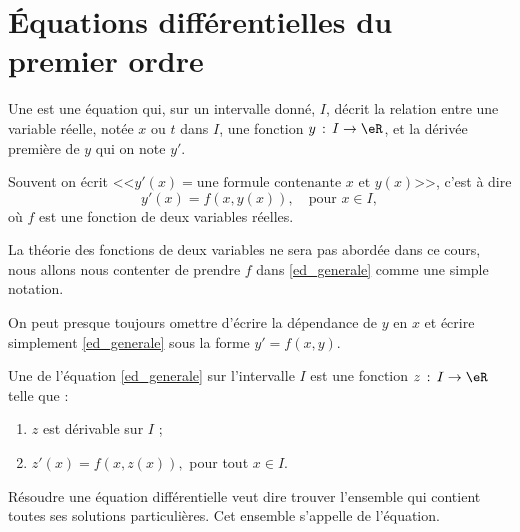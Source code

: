 
\section{Équations différentielles du premier ordre}

\begin{definition}
Une   est une équation qui, sur un intervalle donné, \(I\), décrit la relation entre une variable réelle, notée \(x\) ou \(t\) dans \(I\), une fonction \(y \,:\,I\to\eR \), et la dérivée première de \(y\) qui on note \(y'\). 
\end{definition}
Souvent on écrit <<\(y'(x) = \text{une formule contenante }x \text{ et }y(x)\)>>, c'est \`a dire 
\begin{equation}\label{ed_generale}
  y'(x) = f(x,y(x)),\quad\text{pour }x\in I,
\end{equation}
où \(f\) est une fonction de deux variables réelles.  
\begin{remark}
  La théorie des fonctions de deux variables ne sera pas abordée dans ce cours, nous allons nous contenter de prendre \(f\) dans \eqref{ed_generale} comme une simple notation. 
\end{remark}
On peut presque toujours omettre d'écrire la dépendance de \(y\) en \(x\) et écrire simplement \eqref{ed_generale} sous la forme \(y' = f(x,y)\). 
\begin{definition}
  Une  de l'équation \eqref{ed_generale} sur l'intervalle \(I\) est une fonction \(z\,:\, I\to\eR\) telle que :
  \begin{enumerate}
  \item \(z\) est dérivable sur \(I\) ;
  \item \(z'(x) = f(x, z(x)), \) pour tout \(x\in I\). 
  \end{enumerate}
\end{definition}
\begin{definition}
  Résoudre une équation différentielle veut dire trouver l'ensemble qui contient toutes ses solutions particulières. Cet ensemble s'appelle  de l'équation. 
\end{definition}

